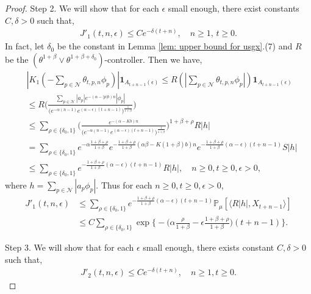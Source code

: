 \documentclass[12pt,a4paper]{amsart}
\theoremstyle{plain}
\theoremstyle{definition}
\numberwithin{equation}{section}
\begin{document}
\begin{proof}
Step 2.  We will show that for each $\epsilon$ small enough, there exist constants $C,\delta>0$ such that,
    \begin{align}
    \label{eq:large rate J1}
      J'_1(t,n,\epsilon)\leq C e^{-\delta(t+n)},\quad n\geq 1, \, t\geq 0.
    \end{align}
	In fact, let $\delta_0$ be the constant in Lemma \ref{lem: upper bound for usgx}.(7) and $R$ be the $(\theta^{1+\beta}\vee \theta^{1+\beta+\delta_0})$-controller. Then we have,
\begin{align}
   & |K_1(-\sum_{p\in \mathcal{N}}\theta_{t,p,n}\phi_p)|\mathbf{1}_{A_{t+n-1}(\epsilon)}
   \leq R(|\sum_{p\in\mathcal{N}}\theta_{t,p,n}\phi_p|)\mathbf{1}_{A_{t+n-1}(\epsilon)}
   \\&\leq R \Big(\frac{\sum_{p\in\mathcal{N}}|a_p|e^{-(\alpha-|p|b)n}|\phi_p|}{\big(e^{-\alpha(n-1)}e^{(\alpha-\epsilon)(t+n-1)}\big)^{\frac{1}{1+\beta}}}\Big)
   \\&\leq \sum_{\rho\in\{\delta_0,1\}}\Big(\frac{e^{-(\alpha-Kb)n}}{\big(e^{-\alpha(n-1)}e^{(\alpha-\epsilon)(t+n-1)}\big)^{\frac{1}{1+\beta}}}\Big)^{1+\beta+\rho}R|h|
   \\&=\sum_{\rho\in\{\delta_0,1\}}e^{-\alpha\frac{1+\beta+\rho}{1+\beta}}e^{-\frac{1+\beta+\rho}{1+\beta}(\alpha\beta-K(1+\beta)b)n}e^{-\frac{1+\beta+\rho}{1+\beta}(\alpha-\epsilon)(t+n-1)}S|h|
   \\&\leq \sum_{\rho\in\{\delta_0,1\}}e^{-\frac{1+\beta+\rho}{1+\beta}(\alpha-\epsilon)(t+n-1)}R|h|,
   \quad n\geq 0, t\geq 0, \epsilon > 0,
\end{align}
where $h=\sum_{p\in \mathcal{N}}|a_p\phi_p|$.
Thus for each $n\geq 0,  t\geq 0, \epsilon > 0$,
\begin{align}
\label{eq: estimate of J11}
     J'_1(t,n,\epsilon)&
     \leq  \sum_{\rho\in\{\delta_0,1\}}e^{-\frac{1+\beta+\rho}{1+\beta}(\alpha-\epsilon)(t+n-1)}\mathbb{P}_{\mu}[\langle R|h|,X_{t+n-1}\rangle]\\
     & \leq C\sum_{\rho\in\{\delta_0,1\}}\exp\Big\{-\Big(\alpha\frac{\rho}{1+\beta}-\epsilon\frac{1+\beta+\rho}{1+\beta}\Big)(t+n-1)\Big\}.
     \end{align}

Step 3.
	We will show that for each $\epsilon$ small enough, there exists constant $C,\delta>0$ such that,
\begin{align}
\label{eq:31step31}
    J'_2(t,n,\epsilon)
    \leq C e^{-\delta(t+n)},
    \quad n\geq 1, t\geq 0.
\end{align}


\end{proof}
\end{document}
